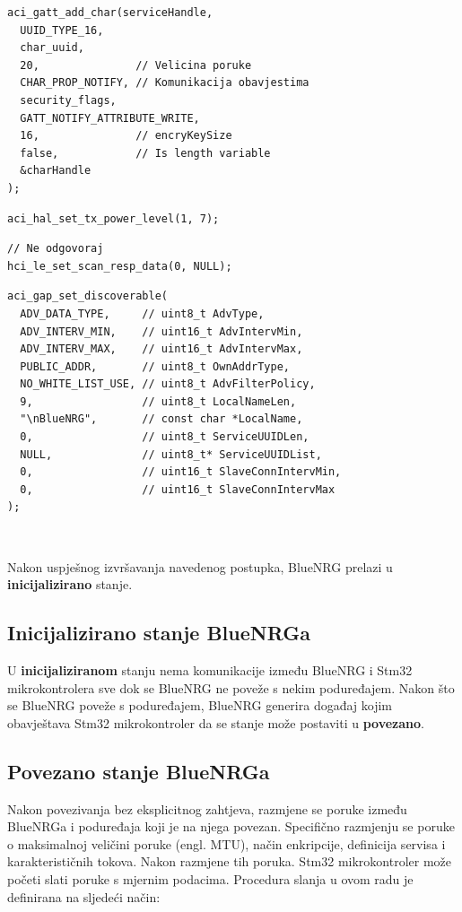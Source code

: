 \documentclass[times, utf8, diplomski]{diplomski}
\begin{document}
\begin{lstlisting}[caption={Postavljanje karakterističnih tokova}]
aci_gatt_add_char(serviceHandle,
  UUID_TYPE_16,
  char_uuid,
  20,               // Velicina poruke
  CHAR_PROP_NOTIFY, // Komunikacija obavjestima
  security_flags,
  GATT_NOTIFY_ATTRIBUTE_WRITE,
  16,               // encryKeySize
  false,            // Is length variable
  &charHandle
);
\end{lstlisting}

\begin{lstlisting}[caption={Postavi snagu odašiljača}]
aci_hal_set_tx_power_level(1, 7);
\end{lstlisting}

\begin{lstlisting}[caption={Postavi odgovor na poruku otkrivanja (engl. discover message)}]
// Ne odgovoraj
hci_le_set_scan_resp_data(0, NULL);
\end{lstlisting}

\begin{lstlisting}[caption={Postavi stanje BlueNRGa u stanje u povezivo stanje}, label={lastinit}]
aci_gap_set_discoverable(
  ADV_DATA_TYPE,     // uint8_t AdvType,
  ADV_INTERV_MIN,    // uint16_t AdvIntervMin,
  ADV_INTERV_MAX,    // uint16_t AdvIntervMax,
  PUBLIC_ADDR,       // uint8_t OwnAddrType,
  NO_WHITE_LIST_USE, // uint8_t AdvFilterPolicy,
  9,                 // uint8_t LocalNameLen,
  "\nBlueNRG",       // const char *LocalName,
  0,                 // uint8_t ServiceUUIDLen,
  NULL,              // uint8_t* ServiceUUIDList,
  0,                 // uint16_t SlaveConnIntervMin,
  0,                 // uint16_t SlaveConnIntervMax
);
\end{lstlisting}
\ \

Nakon uspješnog izvršavanja navedenog postupka, BlueNRG prelazi u \textbf{inicijalizirano} stanje.

\subsection{Inicijalizirano stanje BlueNRGa}
U \textbf{inicijaliziranom} stanju nema komunikacije između BlueNRG i Stm32 mikrokontrolera sve dok se BlueNRG ne poveže s nekim poduređajem. Nakon što se BlueNRG poveže s poduređajem, BlueNRG generira događaj kojim obavještava Stm32 mikrokontroler da se stanje može postaviti u \textbf{povezano}.

\subsection{Povezano stanje BlueNRGa}
Nakon povezivanja bez eksplicitnog zahtjeva, razmjene se poruke između BlueNRGa i poduređaja koji je na njega povezan. Specifično razmjenju se poruke o maksimalnoj veličini poruke (engl. MTU), način enkripcije, definicija servisa i karakterističnih tokova. Nakon razmjene tih poruka. Stm32 mikrokontroler može početi slati poruke s mjernim podacima. Procedura slanja u ovom radu je definirana na sljedeći način:
\end{document}
